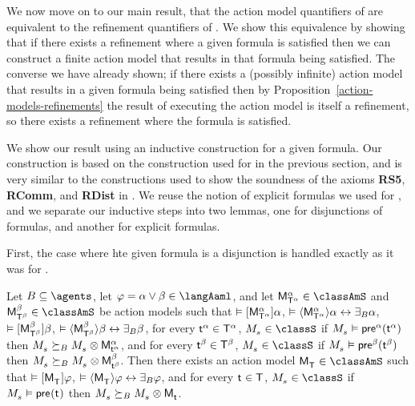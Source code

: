 We now move on to our main result, that the action model quantifiers of \logicAamlS{} are equivalent to the refinement quantifiers of \logicRmlS{}.
We show this equivalence by showing that if there exists a refinement where a given formula is satisfied then we can construct a finite action model that results in that formula being satisfied.
The converse we have already shown; if there exists a (possibly infinite) action model that results in a given formula being satisfied then by Proposition~\ref{action-models-refinements} the result of executing the action model is itself a refinement, so there exists a refinement where the formula is satisfied.

We show our result using an inductive construction for a given formula.
Our construction is based on the construction used for \logicRamlK{} in the previous section, and is very similar to the constructions used to show the soundness of the axioms {\bf RS5}, {\bf RComm}, and {\bf RDist} in \logicRmlS{}.
We reuse the notion of explicit formulas we used for \logicRmlS{}, and we separate our inductive steps into two lemmas, one for disjunctions of formulas, and another for explicit formulas.

First, the case where hte given formula is a disjunction is handled exactly as it was for \logicAamlK{}.

\begin{lemma}\label{aaml-s5-choice}
Let $\agentsB \subseteq \agents$, 
let $\phi = \alpha \lor \beta \in \langAaml$, and 
let $\aPModel[\alpha]{\aStatesT[\alpha]} \in \classAmS$ and $\aPModel[\beta]{\aStatesT[\beta]} \in \classAmS$ be action models such that 
$\entails \actionA{\aPModel[\alpha]{\aStatesT[\alpha]}} \alpha$, 
$\entails \actionE{\aPModel[\alpha]{\aStatesT[\alpha]}} \alpha \iff \someactsBs \alpha$, 
$\entails \actionA{\aPModel[\beta]{\aStatesT[\beta]}} \beta$,
$\entails \actionE{\aPModel[\beta]{\aStatesT[\beta]}} \beta \iff \someactsBs \beta$,
for every $\aStateT[\alpha] \in \aStatesT[\alpha]$, $\kPModel{\kStateS} \in \classS$ if $\kPModel{\kStateS} \entails \aPrecondition[\alpha](\aStateT[\alpha])$ then $\kPModel{\kStateS} \simulatesBs \kPModel{\kStateS} \exec \aPModel[\alpha]{\aStateT[\alpha]}$, and
for every $\aStateT[\beta] \in \aStatesT[\beta]$, $\kPModel{\kStateS} \in \classS$ if $\kPModel{\kStateS} \entails \aPrecondition[\beta](\aStateT[\beta])$ then $\kPModel{\kStateS} \simulatesBs \kPModel{\kStateS} \exec \aPModel[\beta]{\aStateT[\beta]}$.
Then there exists an action model $\aPModel{\aStatesT} \in \classAmS$ such that 
$\entails \actionA{\aPModel{\aStatesT}} \phi$,
$\entails \actionE{\aPModel{\aStatesT}} \phi \iff \someactsBs \phi$, and
for every $\aStateT \in \aStatesT$, $\kPModel{\kStateS} \in \classS$ if $\kPModel{\kStateS} \entails \aPrecondition(\aStateT)$ then $\kPModel{\kStateS} \simulatesBs \kPModel{\kStateS} \exec \aPModel{\aStateT}$.
\end{lemma}

